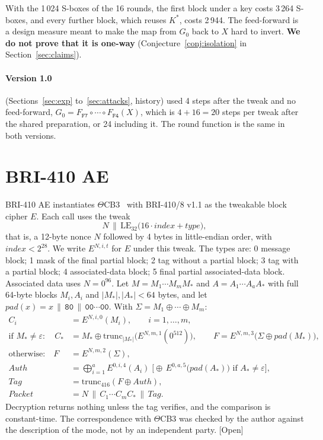 \documentclass[11pt,a4paper]{article}
\newcommand{\ev}[1]{\textup{\textsf{[#1]}}}
\newcommand{\hx}[1]{\mathtt{#1}}
\begin{document}
With the 1\,024 S-boxes of the 16 rounds, the first block under a key costs 3\,264 S-boxes, and every further
block, which reuses $K^*$, costs 2\,944. The feed-forward is a design measure meant to make the map from $G_0$
back to $X$ hard to invert. \textbf{We do not prove that it is one-way} (Conjecture~\ref{conj:isolation} in
Section~\ref{sec:claims}).

\paragraph{Version 1.0} (Sections~\ref{sec:exp} to~\ref{sec:attacks}, history) used 4 steps after the tweak and
no feed-forward, $G_0 = F_{\hx{F7}} \circ \cdots \circ F_{\hx{F4}}(X)$, which is $4 + 16 = 20$ steps per tweak
after the shared preparation, or 24 including it. The round function is the same in both versions.

\section{BRI-410 AE}\label{sec:ae}

BRI-410 AE instantiates $\Theta$CB3~\cite{KR11} with BRI-410/8 v1.1 as the tweakable block cipher $E$. Each call
uses the tweak
\[
  N \,\|\, \mathrm{LE}_{32}\bigl(16\cdot \mathit{index} + \mathit{type}\bigr),
\]
that is, a 12-byte nonce $N$ followed by 4 bytes in little-endian order, with $\mathit{index} < 2^{28}$. We
write $E^{N,i,t}$ for $E$ under this tweak. The types are: 0 message block; 1 mask of the final partial block;
2 tag without a partial block; 3 tag with a partial block; 4 associated-data block; 5 final partial
associated-data block. Associated data uses $N = 0^{96}$. Let $M = M_1\cdots M_m M_*$ and $A = A_1\cdots A_a A_*$
with full 64-byte blocks $M_i, A_i$ and $|M_*|, |A_*| < 64$ bytes, and let $\mathit{pad}(x) = x \,\|\, \hx{80}
\,\|\, \hx{00}\cdots\hx{00}$. With $\Sigma = M_1 \oplus \cdots \oplus M_m$:
\begin{align*}
  C_i &= E^{N,i,0}(M_i), \qquad i = 1,\dots,m,\\
  \text{if } M_* \ne \varepsilon:\quad C_* &= M_* \oplus \mathrm{trunc}_{|M_*|}\bigl(E^{N,m,1}(0^{512})\bigr),
     \qquad F = E^{N,m,3}\bigl(\Sigma \oplus \mathit{pad}(M_*)\bigr),\\
  \text{otherwise:}\quad F &= E^{N,m,2}(\Sigma),\\
  \mathit{Auth} &= \bigoplus_{i=1}^{a} E^{0,i,4}(A_i)\; \bigl[\oplus\, E^{0,a,5}\bigl(\mathit{pad}(A_*)\bigr)
     \text{ if } A_* \ne \varepsilon\bigr],\\
  \mathit{Tag} &= \mathrm{trunc}_{416}(F \oplus \mathit{Auth}),\\
  \mathit{Packet} &= N \,\|\, C_1 \cdots C_m C_* \,\|\, \mathit{Tag}.
\end{align*}
Decryption returns nothing unless the tag verifies, and the comparison is constant-time. The correspondence with
$\Theta$CB3 was checked by the author against the description of the mode, not by an independent party.
\ev{Open}
\end{document}
